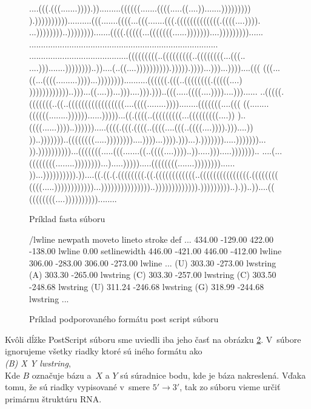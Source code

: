\begin{figure}[H]
\begin{code}[fontsize=\scriptsize, frame=none, samepage=true]
....(((.(((.......)))).)).........((((((.......((((.....((....)).......)))))))))
).))))))))))..........(((.......((((...(((.......(((.(((((((((((((.((((....)))).
...))))))))..)))))))).......((((.(((((...(((((((......)))))))....)))))))))......
................................................................................
..........................................(((((((((..(((((((((..((((((((...(((..
....))).......))))))))..))....(..((....)))))))))).))))).))))...)))...))))....(((
(((...((...((((.........))))...))))))))..........((((((.(((..((((((((.(((((....)
))))))))))))..)))...((....))...)))....))).)))..(((.....((((....))))....)))......
..(((((.(((((((..((..(((((((((((((((((....((((........))))........(((((((....(((
((........((((((........))))))......)))))...((.((((..(((((((((...(((((((((....))
)..((((......))))..)))))).....((((.(((.((((..((((....(((..((((....)))).)))....))
))..)))))))..((((((((.....))))))))....))))...)))).)))...).))))))).....)))))))...
)).))))))))))...(((((((.....(((.......((..((((....))))..)).....))).....)))))))..
....(...((((((((........))))))))...).....))))).....((((((((.......))))))))......
))...)))))))))).))....((.((.(.((((((((.((.((((((((((((..(((((((((((((((.((((((((
((((.....))))))))))))...)))))))))))))))..))))))))))))).)))))))))..).))..))....((
((((((((....))))))))))........
  \end{code}
  \caption{Príklad fasta súboru}
  \label{obr:human_fasta}
\end{figure}

\begin{figure}[H]
\begin{code}[fontsize=\scriptsize, frame=none, samepage=true]
/lwline {newpath moveto lineto stroke} def
  ...
434.00 -129.00 422.00 -138.00 lwline
0.00 setlinewidth
446.00 -421.00 446.00 -412.00 lwline
306.00 -283.00 306.00 -273.00 lwline
  ...
(U) 303.30 -273.00 lwstring
(A) 303.30 -265.00 lwstring
(C) 303.30 -257.00 lwstring
(C) 303.50 -248.68 lwstring
(U) 311.24 -246.68 lwstring
(G) 318.99 -244.68 lwstring
  ...
\end{code}
\caption{Príklad podporovaného formátu post script súboru}
\label{obr:ps_format}
\end{figure}

Kvôli dĺžke PostScript súboru sme uviedli iba jeho časť na obrázku \ref{obr:ps_format}.
V~súbore ignorujeme všetky riadky ktoré sú iného formátu ako
\\
\textit{(B) X Y lwstring},
\\
Kde $B$ označuje bázu a~$X$ a $Y$ sú súradnice bodu, kde je báza nakreslená.
Vďaka tomu, že sú riadky vypisované v~smere $5' \to 3'$, tak zo súboru
vieme určiť primárnu štruktúru RNA.




